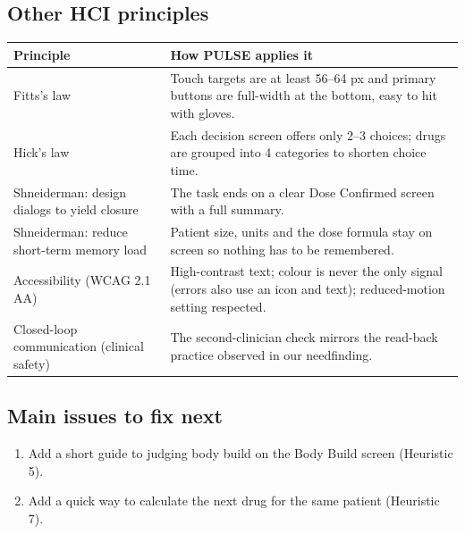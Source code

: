 \documentclass[11pt,a4paper]{article}
\begin{document}
\subsection{Other HCI principles}

{\small
{}
\begin{tabularx}{\textwidth}{>{\raggedright\arraybackslash}p{4.2cm} >{\raggedright\arraybackslash}X}
\toprule
\rowcolor{pulsetint}
\textbf{Principle} & \textbf{How PULSE applies it} \\
\midrule
Fitts's law & Touch targets are at least 56--64 px and primary buttons are full-width at the bottom, easy to hit with gloves. \\
Hick's law & Each decision screen offers only 2--3 choices; drugs are grouped into 4 categories to shorten choice time. \\
Shneiderman: design dialogs to yield closure & The task ends on a clear Dose Confirmed screen with a full summary. \\
Shneiderman: reduce short-term memory load & Patient size, units and the dose formula stay on screen so nothing has to be remembered. \\
Accessibility (WCAG 2.1 AA) & High-contrast text; colour is never the only signal (errors also use an icon and text); reduced-motion setting respected. \\
Closed-loop communication (clinical safety) & The second-clinician check mirrors the read-back practice observed in our needfinding. \\
\bottomrule
\end{tabularx}
}

\subsection{Main issues to fix next}
\begin{enumerate}
  \item Add a short guide to judging body build on the Body Build screen (Heuristic 5).
  \item Add a quick way to calculate the next drug for the same patient (Heuristic 7).
\end{enumerate}
\end{document}
